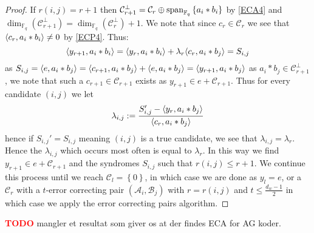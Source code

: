 \begin{proof}
  If $r(i, j) = r + 1$ then $\mathcal{C}_{r + 1}^{\perp} = \mathcal{C}_r \oplus \textnormal{span}_{\mathbb{F}_q} \left\{a_i * b_i\right\}$ by \ref{ECA4} and $\dim_{\mathbb{F}_q}(\mathcal{C}_{r + 1}^{\perp}) = \dim_{\mathbb{F}_q}(\mathcal{C}_r^\perp) + 1$.
  We note that since $c_r \in \mathcal{C}_r$ we see that $\langle c_r, a_i * b_i\rangle \neq 0$ by \ref{ECP4}. Thus:
  \begin{equation*}
    \langle y_{r + 1}, a_i * b_{i}\rangle = \langle y_r, a_i * b_i\rangle + \lambda_r \langle c_r, a_i * b_j\rangle = S_{i, j}
  \end{equation*}
  as $S_{i, j} = \langle e, a_i * b_j\rangle = \langle c_{r + 1}, a_i * b_j\rangle + \langle e, a_i * b_j\rangle = \langle y_{r + 1}, a_i * b_j\rangle$ as $a_i * b_j \in \mathcal{C}_{r + 1}^{\perp}$, we note that such a $c_{r + 1} \in \mathcal{C}_{r + 1}$ exists as $y_{r + 1} \in e + \mathcal{C}_{r + 1}$.
  Thus for every candidate $(i, j)$ we let
  \begin{equation*}
    \lambda_{i, j} := \frac{S_{i, j}' - \langle y_r, a_i*b_j\rangle}{\langle c_r, a_{i} * b_{j}\rangle}
  \end{equation*}
  hence if $S_{i, j}' = S_{i, j}$ meaning $(i, j)$ is a true candidate, we see that $\lambda_{i, j} = \lambda_r$. Hence the $\lambda_{i, j}$ which occurs most often is equal to $\lambda_r$. In this way we find $y_{r + 1} \in e + \mathcal{C}_{r + 1}$ and the syndromes $S_{i, j}$ such that $r(i, j) \leq r + 1$. We continue this process until we reach $\mathcal{C}_l = \left\{0\right\}$, in which case we are done as $y_l = e$, or a $\mathcal{C}_r$ with a $t$-error correcting pair $(\mathcal{A}_i, \mathcal{B}_j)$ with $r = r(i, j)$ and $t \leq \frac{d_{w} - 1}{2}$ in which case we apply the error correcting pairs algorithm.
\end{proof}

\textcolor{red}{\textbf{TODO}} mangler et resultat som giver os at der findes ECA for AG koder.
